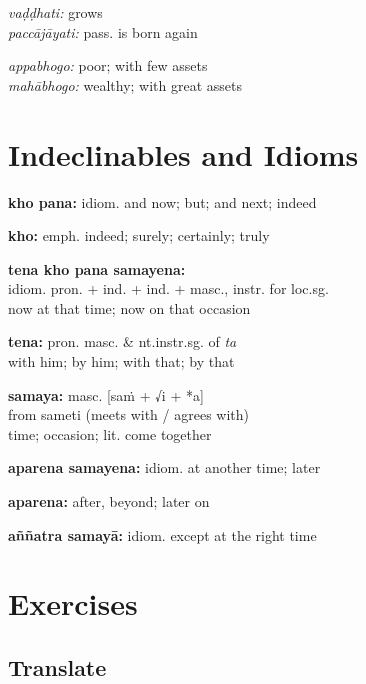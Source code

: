 \documentclass[11pt,oneside]{memoir}
\begin{document}
\normalArrayStrech

\bigskip

\begin{twocols}
\emph{vaḍḍhati:} grows \\[0pt]
\emph{paccājāyati:} pass. is born again

\columnbreak

\emph{appabhogo:} poor; with few assets \\[0pt]
\emph{mahābhogo:} wealthy; with great assets
\end{twocols}

\section{Indeclinables and Idioms}
\label{sec:orgc7bc476}

\begin{multicols}{2}

\textbf{kho pana:} idiom. and now; but; and next; indeed

\textbf{kho:} emph. indeed; surely; certainly; truly

\textbf{tena kho pana samayena:} \\[0pt]
idiom. pron. + ind. + ind. + masc., instr. for loc.sg. \\[0pt]
now at that time; now on that occasion

\textbf{tena:} pron. masc. \& nt.instr.sg. of \emph{ta} \\[0pt]
with him; by him; with that; by that

\columnbreak

\textbf{samaya:} masc. [saṁ + √i + *a] \\[0pt]
from sameti (meets with / agrees with) \\[0pt]
time; occasion; lit. come together

\textbf{aparena samayena:} idiom. at another time; later

\textbf{aparena:} after, beyond; later on

\textbf{aññatra samayā:} idiom. except at the right time

\end{multicols}

\clearpage

\section{Exercises}
\label{sec:org656af12}
\subsection{Translate}
\label{sec:orgc6808dc}
\end{document}
